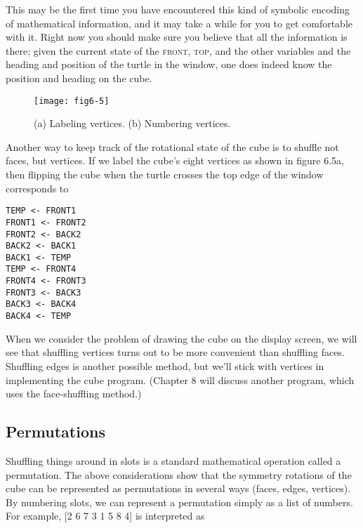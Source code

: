 \documentclass{book}
\begin{document}
This may be the first time you have encountered this kind of symbolic
encoding of mathematical information, and it may take a while for you
to get comfortable with it. Right now you should make sure you believe
that all the information is there; given the current state of the \textsc{front},
\textsc{top}, and the other variables and the heading and position of the turtle
in the window, one does indeed know the position and heading on the
cube.

\begin{figure}
\begin{center}
\texttt{[image: fig6-5]}
\caption{(a) Labeling vertices. (b) Numbering vertices.}
\end{center}
\end{figure}

Another way to keep track of the rotational state of the cube is to
shuffle not faces, but vertices. If we label the cube's eight vertices as
shown in figure 6.5a, then flipping the cube when the turtle crosses the
top edge of the window corresponds to

\begin{verbatim}
TEMP <- FRONT1
FRONT1 <- FRONT2
FRONT2 <- BACK2
BACK2 <- BACK1
BACK1 <- TEMP
TEMP <- FRONT4
FRONT4 <- FRONT3
FRONT3 <- BACK3
BACK3 <- BACK4
BACK4 <- TEMP
\end{verbatim}
When we consider the problem of drawing the cube on the display
screen, we will see that shuffling vertices turns out to be more convenient
than shuffling faces. Shuffling edges is another possible method, but we'll
stick with vertices in implementing the cube program. (Chapter 8 will
discuss another program, which uses the face-shuffling method.)

\subsection{Permutations}

Shuffling things around in slots is a standard mathematical operation
called a permutation. The above considerations show that the symmetry
rotations of the cube can be represented as permutations in several ways
(faces, edges, vertices). By numbering slots, we can represent a permutation simply as a list of numbers. For example, [2 6 7 3 1 5 8 4] is
interpreted as
\end{document}
